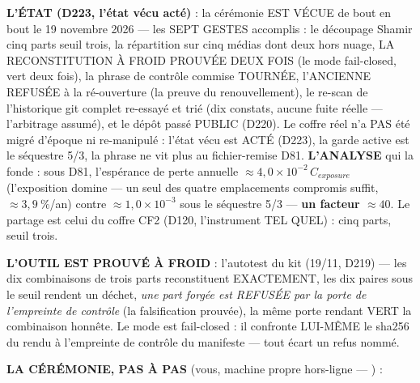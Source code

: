 \textbf{L'ÉTAT (D223, l'état vécu acté)} : la cérémonie EST VÉCUE de bout
en bout le 19 novembre 2026 — les SEPT GESTES accomplis : le découpage
Shamir cinq parts seuil trois, la répartition sur cinq médias dont deux
hors nuage, LA RECONSTITUTION À FROID PROUVÉE DEUX FOIS (le mode
 fail-closed, vert deux fois), la phrase de contrôle
commise TOURNÉE, l'ANCIENNE REFUSÉE à la ré-ouverture (la preuve du
renouvellement), le re-scan de l'historique git complet re-essayé et trié
(dix constats, aucune fuite réelle — l'arbitrage assumé), et le dépôt
passé PUBLIC (D220). Le coffre réel n'a PAS été migré d'époque ni
re-manipulé : l'état vécu est ACTÉ (D223), la garde active est le
séquestre 5/3, la phrase ne vit plus au fichier-remise D81.
\textbf{L'ANALYSE} qui la fonde : sous D81, l'espérance de perte annuelle
$\approx 4{,}0 \times 10^{-2}\,C_{exposure}$ (l'exposition domine — un seul
des quatre emplacements compromis suffit, $\approx 3{,}9~\%$/an) contre
$\approx 1{,}0 \times 10^{-3}$ sous le séquestre 5/3 — \textbf{un facteur
$\approx 40$}. Le partage est celui du coffre CF2 (D120, l'instrument
 TEL QUEL) : cinq parts, seuil trois.

\textbf{L'OUTIL EST PROUVÉ À FROID} : l'autotest du kit (19/11, D219) — les
dix combinaisons de trois parts reconstituent EXACTEMENT, les dix paires
sous le seuil rendent un déchet, \emph{une part forgée est REFUSÉE par la
porte de l'empreinte de contrôle} (la falsification prouvée), la même porte
rendant VERT la combinaison honnête. Le mode  est
fail-closed : il confronte LUI-MÊME le sha256 du rendu à l'empreinte de
contrôle du manifeste — tout écart un refus nommé.

\textbf{LA CÉRÉMONIE, PAS À PAS} (vous, machine propre hors-ligne —
) :

